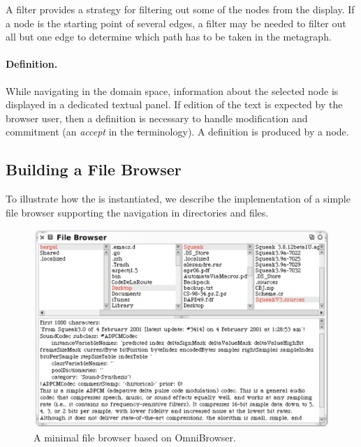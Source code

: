 \documentclass[a4paper,10pt,twoside]{book}
\begin{document}

A filter provides a strategy for filtering out some of the nodes from the display. If a node is the starting point of several edges, a filter may be needed to filter out all but one edge to determine which path has to be taken in the metagraph. 

\paragraph{Definition.} While navigating in the domain space, information about the selected node is displayed in a dedicated textual panel. If edition of the text is expected by the browser user, then a definition is necessary to handle modification and commitment (\ie an \emph{accept} in the \st terminology). A definition is produced by a node. 


\subsection{Building a File Browser}\label{sec:fileBrowserExample}

To illustrate how the \obf is instantiated, we describe the implementation of a simple file browser supporting the navigation in directories and files.

\begin{figure}[!ht]
\begin{center}
\includegraphics[scale=0.54]{filebrowser}
\caption{A minimal file browser based on OmniBrowser.} \label{fig:filebrowser}
\end{center}
\end{figure}
\end{document}
